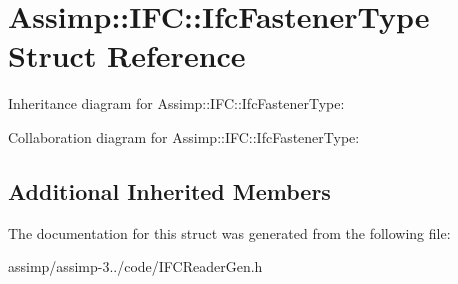 \hypertarget{struct_assimp_1_1_i_f_c_1_1_ifc_fastener_type}{\section{Assimp\+:\+:I\+F\+C\+:\+:Ifc\+Fastener\+Type Struct Reference}
\label{struct_assimp_1_1_i_f_c_1_1_ifc_fastener_type}
}


Inheritance diagram for Assimp\+:\+:I\+F\+C\+:\+:Ifc\+Fastener\+Type\+:


Collaboration diagram for Assimp\+:\+:I\+F\+C\+:\+:Ifc\+Fastener\+Type\+:
\subsection*{Additional Inherited Members}


The documentation for this struct was generated from the following file\+:\begin{DoxyCompactItemize}
\item 
assimp/assimp-\/3../code/I\+F\+C\+Reader\+Gen.\+h\end{DoxyCompactItemize}
